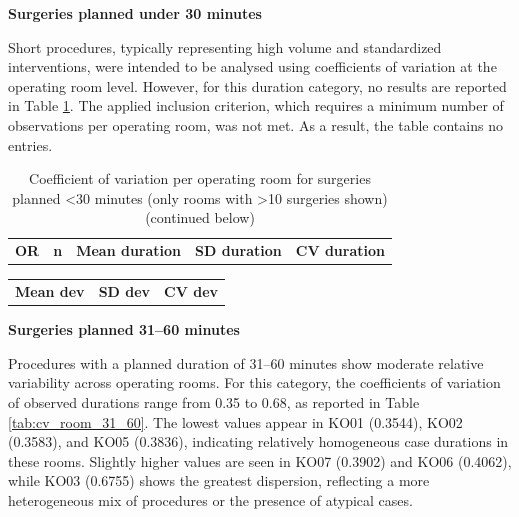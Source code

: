 \documentclass[
]{article}
\begin{document}
\vspace{1em}

\noindent\textbf{Surgeries planned under 30 minutes} \vspace{0.5em}

Short procedures, typically representing high volume and standardized
interventions, were intended to be analysed using coefficients of
variation at the operating room level. However, for this duration
category, no results are reported in Table \ref{tab:cv_room_lt30}. The
applied inclusion criterion, which requires a minimum number of
observations per operating room, was not met. As a result, the table
contains no entries.

\begin{longtable}[]{@{}
  >{\centering\arraybackslash}p{}
  >{\centering\arraybackslash}p{}
  >{\centering\arraybackslash}p{}
  >{\centering\arraybackslash}p{}
  >{\centering\arraybackslash}p{}@{}}
\caption{Coefficient of variation per operating room for surgeries
planned \textless30 minutes (only rooms with \textgreater10 surgeries
shown) \label{tab:cv_room_lt30} (continued below)}\tabularnewline
\toprule\noalign{}
\endfirsthead
\endhead
\bottomrule\noalign{}
\endlastfoot
\textbf{OR} & \textbf{n} & \textbf{Mean duration} & \textbf{SD duration}
& \textbf{CV duration} \\
\end{longtable}

\begin{longtable}[]{@{}
  >{\centering\arraybackslash}p{}
  >{\centering\arraybackslash}p{}
  >{\centering\arraybackslash}p{}@{}}
\toprule\noalign{}
\endhead
\bottomrule\noalign{}
\endlastfoot
\textbf{Mean dev} & \textbf{SD dev} & \textbf{CV dev} \\
\end{longtable}

\vspace{1em}

\noindent\textbf{Surgeries planned 31–60 minutes} \vspace{0.5em}

Procedures with a planned duration of 31--60 minutes show moderate
relative variability across operating rooms. For this category, the
coefficients of variation of observed durations range from 0.35 to 0.68,
as reported in Table \ref{tab:cv_room_31_60}. The lowest values appear
in KO01 (0.3544), KO02 (0.3583), and KO05 (0.3836), indicating
relatively homogeneous case durations in these rooms. Slightly higher
values are seen in KO07 (0.3902) and KO06 (0.4062), while KO03 (0.6755)
shows the greatest dispersion, reflecting a more heterogeneous mix of
procedures or the presence of atypical cases.
\end{document}
